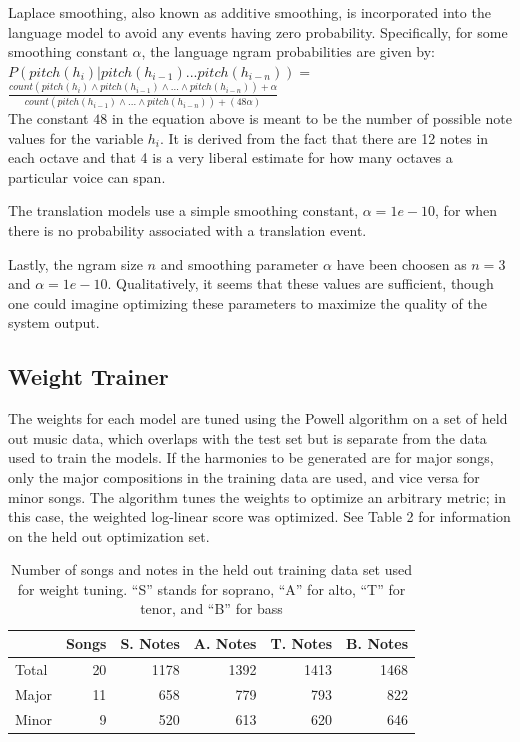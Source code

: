 \documentclass{sig-alternate}
\begin{document}
Laplace smoothing, also known as additive smoothing, is incorporated into the language model to avoid any events having zero probability. Specifically, for some smoothing constant $\alpha$, the language ngram probabilities are given by: \\

$P(pitch(h_{i}) | pitch(h_{i - 1}) ... pitch(h_{i - n})) = $\\

$\frac{count(pitch(h_{i}) \wedge pitch(h_{i - 1}) \wedge ... \wedge pitch(h_{i - n})) + \alpha}{count(pitch(h_{i - 1}) \wedge ... \wedge pitch(h_{i - n})) + (48\alpha)}$\\

The constant $48$ in the equation above is meant to be the number of possible note values for the variable $h_{i}$. It is derived from the fact that there are 12 notes in each octave and that 4 is a very liberal estimate for how many octaves a particular voice can span. 

The translation models use a simple smoothing constant, $\alpha = 1e-10$, for when there is no probability associated with a translation event.

Lastly, the ngram size $n$ and smoothing parameter $\alpha$ have been choosen as $n = 3$ and $\alpha = 1e-10$. Qualitatively, it seems that these values are sufficient, though one could imagine optimizing these parameters to maximize the quality of the system output.

\subsection{Weight Trainer}
The weights for each model are tuned using the Powell algorithm \cite{Koehn:2010:SMT:1734086} on a set of held out music data, which overlaps with the test set but is separate from the data used to train the models. If the harmonies to be generated are for major songs, only the major compositions in the training data are used, and vice versa for minor songs. The algorithm tunes the weights to optimize an arbitrary metric; in this case, the weighted log-linear score was optimized. See Table 2 for information on the held out optimization set. 

\begin{table}[h]
  \begin{center}
      \begin{tabular}{| l | r | r | r | r | r |}
      \hline
       \  & Songs & S. Notes & A. Notes & T. Notes & B. Notes \\ \hline
       Total &  20 & 1178 & 1392 & 1413 & 1468 \\ 
       Major &  11 & 658 & 779 & 793 & 822 \\ 
       Minor & 9 & 520 & 613 & 620 & 646  \\ \hline
      \end{tabular}
  \end{center}
  \caption{Number of songs and notes in the held out training data set used for weight tuning. ``S'' stands for soprano, ``A'' for alto, ``T'' for tenor, and ``B'' for bass}
\end{table}
\end{document}
